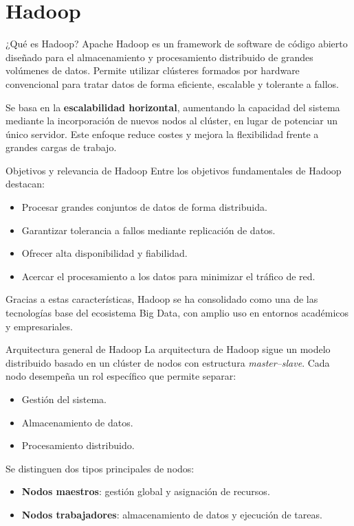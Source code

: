 \documentclass{beamer}
\begin{document}

\section{Hadoop}

\begin{frame}{¿Qué es Hadoop?}
Apache Hadoop es un framework de software de código abierto diseñado para el almacenamiento y procesamiento distribuido de grandes volúmenes de datos. Permite utilizar clústeres formados por hardware convencional para tratar datos de forma eficiente, escalable y tolerante a fallos.

Se basa en la \textbf{escalabilidad horizontal}, aumentando la capacidad del sistema mediante la incorporación de nuevos nodos al clúster, en lugar de potenciar un único servidor. Este enfoque reduce costes y mejora la flexibilidad frente a grandes cargas de trabajo.
\end{frame}

\begin{frame}{Objetivos y relevancia de Hadoop}
Entre los objetivos fundamentales de Hadoop destacan:
\begin{itemize}
    \item Procesar grandes conjuntos de datos de forma distribuida.
    \item Garantizar tolerancia a fallos mediante replicación de datos.
    \item Ofrecer alta disponibilidad y fiabilidad.
    \item Acercar el procesamiento a los datos para minimizar el tráfico de red.
\end{itemize}

Gracias a estas características, Hadoop se ha consolidado como una de las tecnologías base del ecosistema Big Data, con amplio uso en entornos académicos y empresariales.
\end{frame}

\begin{frame}{Arquitectura general de Hadoop}
La arquitectura de Hadoop sigue un modelo distribuido basado en un clúster de nodos con estructura \textit{master--slave}. Cada nodo desempeña un rol específico que permite separar:
\begin{itemize}
    \item Gestión del sistema.
    \item Almacenamiento de datos.
    \item Procesamiento distribuido.
\end{itemize}

Se distinguen dos tipos principales de nodos:
\begin{itemize}
    \item \textbf{Nodos maestros}: gestión global y asignación de recursos.
    \item \textbf{Nodos trabajadores}: almacenamiento de datos y ejecución de tareas.
\end{itemize}
\end{frame}
\end{document}
